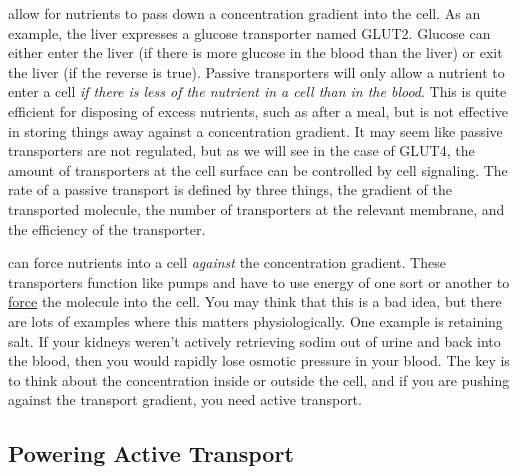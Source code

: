 \documentclass{tufte-handout}
\begin{document}
 allow for nutrients to pass down a concentration gradient into the cell.  As an example, the liver expresses a glucose transporter named GLUT2.  Glucose can either enter the liver (if there is more glucose in the blood than the liver) or exit the liver (if the reverse is true).  Passive transporters will only allow a nutrient to enter a cell \emph{if there is less of the nutrient in a cell than in the blood}.  This is quite efficient for disposing of excess nutrients, such as after a meal, but is not effective in storing things away against a concentration gradient.  It may seem like passive transporters are not regulated, but as we will see in the case of GLUT4, the amount of transporters at the cell surface can be controlled by cell signaling.  The rate of a passive transport is defined by three things, the gradient of the transported molecule, the number of transporters at the relevant membrane, and the efficiency of the transporter.

 can force nutrients into a cell \emph{against} the concentration gradient.  These transporters function like pumps and have to use energy of one sort or another to \underline{force} the molecule into the cell.  You may think that this is a bad idea, but there are lots of examples where this matters physiologically.  One example is retaining salt.  If your kidneys weren't actively retrieving sodim out of urine and back into the blood, then you would rapidly lose osmotic pressure in your blood. The key is to think about the concentration inside or outside the cell, and if you are pushing against the transport gradient, you need active transport.

\subsection{Powering Active Transport}
\end{document}
